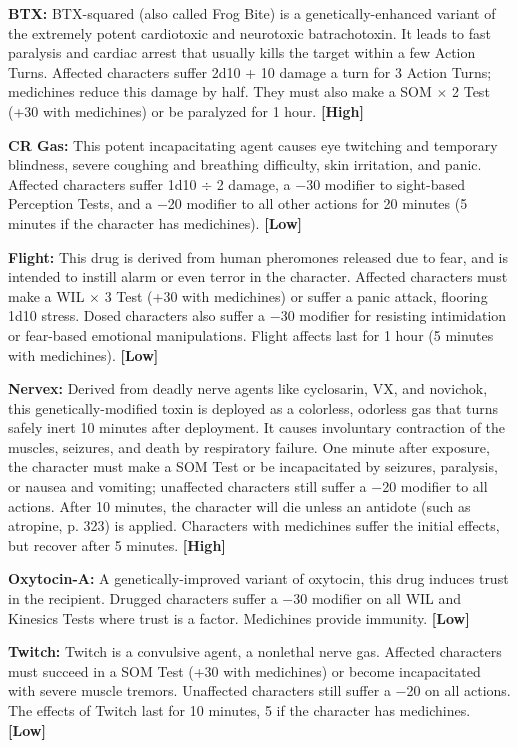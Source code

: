 \textbf{BTX:} BTX-squared (also called Frog Bite) is a genetically-enhanced variant of the extremely potent cardiotoxic and neurotoxic batrachotoxin. It leads to fast paralysis and cardiac arrest that usually kills the target within a few Action Turns. Affected characters suffer 2d10 + 10 damage a turn for 3 Action Turns; medichines reduce this damage by half. They must also make a SOM $\times$ 2 Test (+30 with medichines) or be paralyzed for 1 hour. \textbf{[High]}

\textbf{CR Gas:} This potent incapacitating agent causes eye twitching and temporary blindness, severe coughing and breathing difficulty, skin irritation, and panic. Affected characters suffer 1d10 $\div$ 2 damage, a $-$30 modifier to sight-based Perception Tests, and a $-$20 modifier to all other actions for 20 minutes (5 minutes if the character has medichines). \textbf{[Low]}

\textbf{Flight:} This drug is derived from human pheromones released due to fear, and is intended to instill alarm or even terror in the character. Affected characters must make a WIL $\times$ 3 Test (+30 with medichines) or suffer a panic attack, flooring 1d10 stress. Dosed characters also suffer a $-$30 modifier for resisting intimidation or fear-based emotional manipulations. Flight affects last for 1 hour (5 minutes with medichines). \textbf{[Low]}

\textbf{Nervex:} Derived from deadly nerve agents like cyclosarin, VX, and novichok, this genetically-modified toxin is deployed as a colorless, odorless gas that turns safely inert 10 minutes after deployment. It causes involuntary contraction of the muscles, seizures, and death by respiratory failure. One minute after exposure, the character must make a SOM Test or be incapacitated by seizures, paralysis, or nausea and vomiting; unaffected characters still suffer a $-$20 modifier to all actions. After 10 minutes, the character will die unless an antidote (such as atropine, p. 323) is applied. Characters with medichines suffer the initial effects, but recover after 5 minutes. \textbf{[High]}

\textbf{Oxytocin-A:} A genetically-improved variant of oxytocin, this drug induces trust in the recipient. Drugged characters suffer a $-$30 modifier on all WIL and Kinesics Tests where trust is a factor. Medichines provide immunity. \textbf{[Low]}

\textbf{Twitch:} Twitch is a convulsive agent, a nonlethal nerve gas. Affected characters must succeed in a SOM Test (+30 with medichines) or become incapacitated with severe muscle tremors. Unaffected characters still suffer a $-$20 on all actions. The effects of Twitch last for 10 minutes, 5 if the character has medichines. \textbf{[Low]}


